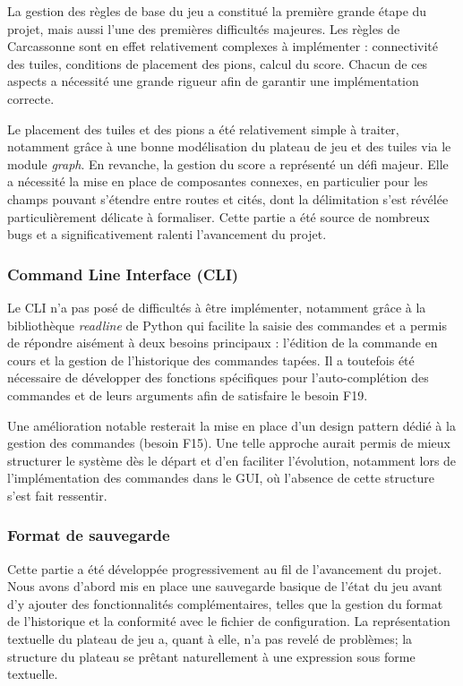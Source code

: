 \documentclass[11pt]{article}
\begin{document}
La gestion des règles de base du jeu a constitué la première grande 
étape du projet, mais aussi l'une des premières difficultés majeures. 
Les règles de Carcassonne sont en effet relativement complexes à 
implémenter : connectivité des tuiles, conditions de placement des 
pions, calcul du score. Chacun de ces aspects a nécessité une grande 
rigueur afin de garantir une implémentation correcte.

Le placement des tuiles et des pions a été relativement simple à 
traiter, notamment grâce à une bonne modélisation du plateau de jeu 
et des tuiles via le module \textit{graph}. En revanche, la gestion 
du score a représenté un défi majeur. Elle a nécessité la mise en place 
de composantes connexes, en particulier pour les champs pouvant 
s'étendre entre routes et cités, dont la délimitation s'est révélée 
particulièrement délicate à formaliser. Cette partie a été source de 
nombreux bugs et a significativement ralenti l'avancement du projet.

\subsubsection{Command Line Interface (CLI)}

Le CLI n'a pas posé de difficultés à être implémenter, notamment grâce à la 
bibliothèque \textit{readline} de Python qui facilite la saisie des 
commandes et a permis de répondre aisément à deux besoins principaux : 
l'édition de la commande en cours et la gestion de l'historique des 
commandes tapées. Il a toutefois été nécessaire de développer des 
fonctions spécifiques pour l'auto-complétion des commandes et de leurs 
arguments afin de satisfaire le besoin F19.

Une amélioration notable resterait la mise en place d'un design pattern 
dédié à la gestion des commandes (besoin F15). Une telle approche aurait 
permis de mieux structurer le système dès le départ et d'en faciliter 
l'évolution, notamment lors de l'implémentation des commandes dans le 
GUI, où l'absence de cette structure s'est fait ressentir.


\subsubsection{Format de sauvegarde}

Cette partie a été développée progressivement au fil de l'avancement du projet. 
Nous avons d'abord mis en place une sauvegarde basique de l'état du jeu avant d'y ajouter des fonctionnalités complémentaires, telles que la gestion du format de l'historique et la conformité avec le fichier de configuration.
La 
représentation textuelle du plateau de jeu a, quant à elle, n'a pas 
revelé de problèmes; la structure du plateau se prêtant 
naturellement à une expression sous forme textuelle.
\end{document}
